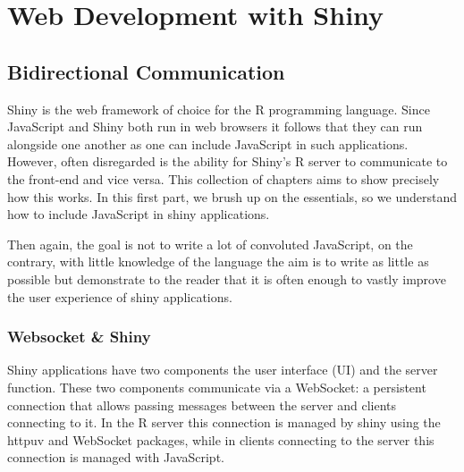 \documentclass[10pt,]{krantz}
\begin{document}
\hypertarget{part-web-development-with-shiny}{%
\part{Web Development with Shiny}\label{part-web-development-with-shiny}}

\hypertarget{shiny-intro}{%
\chapter{Bidirectional Communication}\label{shiny-intro}}

Shiny is the web framework of choice for the R programming language. Since JavaScript and Shiny both run in web browsers it follows that they can run alongside one another as one can include JavaScript in such applications. However, often disregarded is the ability for Shiny's R server to communicate to the front-end and vice versa. This collection of chapters aims to show precisely how this works. In this first part, we brush up on the essentials, so we understand how to include JavaScript in shiny applications.

Then again, the goal is not to write a lot of convoluted JavaScript, on the contrary, with little knowledge of the language the aim is to write as little as possible but demonstrate to the reader that it is often enough to vastly improve the user experience of shiny applications.

\hypertarget{shiny-intro-websocket}{%
\section{Websocket \& Shiny}\label{shiny-intro-websocket}}

Shiny applications have two components the user interface (UI) and the server function. These two components communicate via a WebSocket: a persistent connection that allows passing messages between the server and clients connecting to it. In the R server this connection is managed by shiny using the httpuv \citep{R-httpuv} and WebSocket \citep{R-websocket} packages, while in clients connecting to the server this connection is managed with JavaScript.
\end{document}
